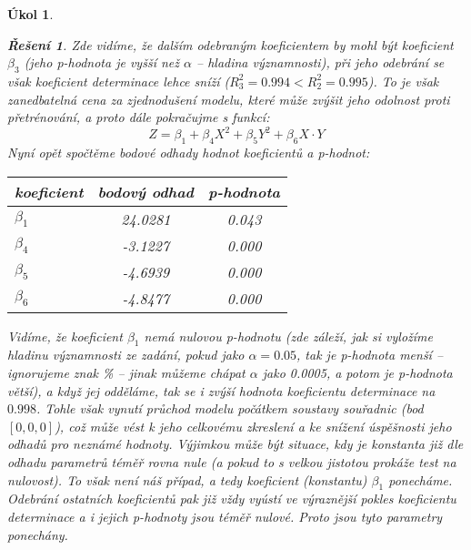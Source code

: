 \documentclass[11pt, a4paper]{article}
\theoremstyle{result}
\newtheorem*{result}{Řešení}
\newtheorem{task}{Úkol}
\begin{document}
\begin{task}
\begin{enumerate}[a)]
\begin{result}
            Zde vidíme, že dalším odebraným koeficientem by mohl být koeficient $\beta_3$ (jeho \textit{p-hodnota} je vyšší než $\alpha$ -- hladina významnosti), při jeho odebrání se však koeficient determinace lehce sníží ($R^2_3 = 0.994 < R^2_2 = 0.995$). To je však zanedbatelná cena za zjednodušení modelu, které může zvýšit jeho odolnost proti přetrénování, a proto dále pokračujme s funkcí:
            $$Z = \beta_1 + \beta_4 X^2 + \beta_5 Y^2 + \beta_6 X \cdot Y$$
            Nyní opět spočtěme bodové odhady hodnot koeficientů a \textit{p-hodnot}:

            \begin{center}
                \begin{tabular}{ |l|c|c| }
                    \hline
                    \textbf{koeficient} & \textbf{bodový odhad} & \textbf{p-hodnota} \\
                    \hline
                    \boldmath$\beta_1$ & 24.0281 & 0.043 \\
                    \hline
                    \boldmath$\beta_4$ & -3.1227 & 0.000 \\
                    \hline
                    \boldmath$\beta_5$ & -4.6939 & 0.000 \\
                    \hline
                    \boldmath$\beta_6$ & -4.8477 & 0.000 \\
                    \hline
                \end{tabular}
            \end{center}
            
            Vidíme, že koeficient $\beta_1$ nemá nulovou \textit{p-hodnotu} (zde záleží, jak si vyložíme hladinu významnosti ze zadání, pokud jako $\alpha = 0.05$, tak je \textit{p-hodnota} menší -- ignorujeme znak \% -- jinak můžeme chápat $\alpha$ jako 0.0005, a potom je \textit{p-hodnota} větší), a když jej odděláme, tak se i zvýší hodnota koeficientu determinace na $0.998$. Tohle však vynutí průchod modelu počátkem soustavy souřadnic (bod $[0, 0, 0]$), což může vést k jeho celkovému zkreslení a ke snížení úspěšnosti jeho odhadů pro neznámé hodnoty. Výjimkou může být situace, kdy je konstanta již dle odhadu parametrů téměř rovna nule (a pokud to s velkou jistotou prokáže test na nulovost). To však není náš případ, a tedy koeficient (konstantu) $\beta_1$ ponecháme. Odebrání ostatních koeficientů pak již vždy vyústí ve výraznější pokles koeficientu determinace a i jejich \textit{p-hodnoty} jsou téměř nulové. Proto jsou tyto parametry ponechány.
        \end{result}
        

\end{enumerate}
\end{task}
\end{document}
